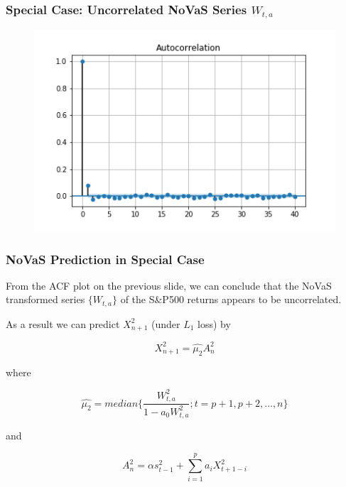 \documentclass{beamer}
\begin{document}
\begin{frame}
\frametitle{Special Case: Uncorrelated NoVaS Series $W_{t,a}$}
\begin{figure}[h!]
\includegraphics[width=\textwidth]{novas_sp500_returns_acf.png}
\end{figure}
\end{frame}


\begin{frame}
\frametitle{NoVaS Prediction in Special Case}
From the ACF plot on the previous slide, we can conclude that the NoVaS transformed series $\{W_{t,a}\}$ of the S\&P500 returns appears to be uncorrelated.\\

\vspace{5pt}

As a result we can predict $X_{n+1}^2$ (under $L_1$ loss) by

$$ X_{n+1}^2 = \widehat{\mu_2}A_{n}^2 $$

where

$$ \widehat{\mu_2} = median \{ \frac{W_{t,a}^2}{1-a_0W_{t,a}^2} ; t = p+1, p+2, \dots, n\} $$

and

$$ A_{n}^2 = \alpha s^2_{t-1} + \sum_{i=1}^{p} a_i X^2_{t+1-i} $$
\end{frame}
\end{document}
